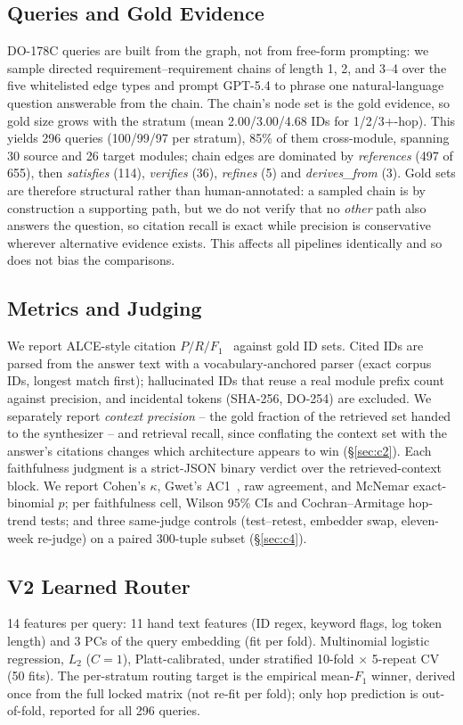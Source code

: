 \subsection{Queries and Gold Evidence}
\label{sec:queries}
DO-178C queries are built from the graph, not from free-form prompting:
we sample directed requirement--requirement chains of length 1, 2, and
3--4 over the five whitelisted edge types and prompt GPT-5.4 to phrase
one natural-language question answerable from the chain. The chain's
node set is the gold evidence, so gold size grows with the stratum
(mean 2.00/3.00/4.68 IDs for 1/2/3+-hop). This yields 296 queries
(100/99/97 per stratum), 85\% of them cross-module, spanning 30 source
and 26 target modules; chain edges are dominated by
\textit{references} (497 of 655), then \textit{satisfies} (114),
\textit{verifies} (36), \textit{refines} (5) and \textit{derives\_from}
(3). Gold sets are therefore structural rather than human-annotated: a
sampled chain is by construction a supporting path, but we do not
verify that no \emph{other} path also answers the question, so citation
recall is exact while precision is conservative wherever alternative
evidence exists. This affects all pipelines identically and so does not
bias the comparisons.

\subsection{Metrics and Judging}
\label{sec:metrics}
We report ALCE-style citation $P/R/F_1$~\cite{alce2023} against
gold ID sets. Cited IDs are parsed from the answer text with a
vocabulary-anchored parser (exact corpus IDs, longest match first);
hallucinated IDs that reuse a real module prefix count against
precision, and incidental tokens (SHA-256, DO-254) are excluded. We
separately report \emph{context precision} -- the gold fraction of the
retrieved set handed to the synthesizer -- and retrieval recall, since
conflating the context set with the answer's citations changes which
architecture appears to win (\S\ref{sec:c2}). Each
faithfulness judgment is a strict-JSON binary verdict over the
retrieved-context block. We report Cohen's $\kappa$, Gwet's
AC1~\cite{gwet2008,feinstein1990}, raw agreement, and McNemar
exact-binomial $p$; per faithfulness cell, Wilson 95\% CIs and
Cochran--Armitage hop-trend tests; and three same-judge controls
(test--retest, embedder swap, eleven-week re-judge) on a paired
300-tuple subset (\S\ref{sec:c4}).

\subsection{V2 Learned Router}
\label{sec:routerdesign}
14 features per query: 11 hand text features (ID regex, keyword flags,
log token length) and 3 PCs of the query embedding (fit per fold).
Multinomial logistic regression, $L_2$ ($C{=}1$), Platt-calibrated,
under stratified 10-fold $\times$ 5-repeat CV (50 fits). The per-stratum
routing target is the empirical mean-$F_1$ winner, derived once from
the full locked matrix (not re-fit per fold); only hop prediction is
out-of-fold, reported for all 296 queries.
